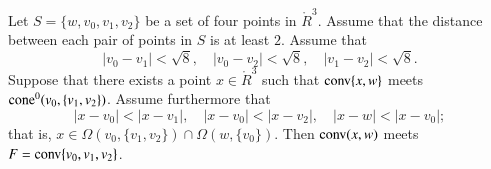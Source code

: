 \newpage


\begin{lemma}
Let $S=\{w,v_0,v_1,v_2\}$ be a set of four points
in $\ring{R}^3$.  Assume that the distance between each pair
of points in $S$
is at least $2$.  Assume that
   $$
   |v_0-v_1| < \sqrt8,\quad |v_0-v_2| < \sqrt8,\quad |v_1-v_2| < \sqrt8.
   $$
Suppose that there exists a point $x\in\ring{R}^3$
such that 
  ${\operatorname{conv}}\{x,w\}$ meets ${\operatorname{cone}}^0(v_0,\{v_1,v_2\})$.  
Assume furthermore that
  $$
  |x-v_0| < |x-v_1|,\quad 
  |x-v_0| < |x-v_2|,\quad
  |x-w| < |x-v_0|;
  $$
that is, $x\in\Omega(v_0,\{v_1,v_2\})\cap \Omega(w,\{v_0\})$.
Then ${\operatorname{conv}}(x,w)$ meets $F={\operatorname{conv}}\{v_0,v_1,v_2\}$.
\end{lemma}


